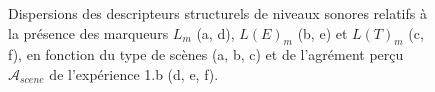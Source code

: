 \begin{figure}[t]
        \caption{Dispersions  des descripteurs structurels de niveaux sonores relatifs à la présence des marqueurs $L_m$ (a, d), $L(E)_m$ (b, e) et $L(T)_m$ (c, f), en fonction du type de scènes (a, b, c) et de l'agrément perçu $\mathcal{A}_{scene}$ de l'expérience 1.b (d, e, f).}\label{fig:soundlevelMarker}
\end{figure}

